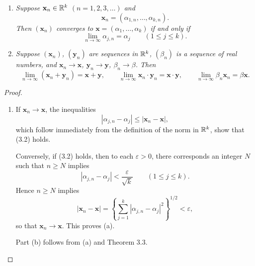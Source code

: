 \begin{enumerate}[label=(\alph*), leftmargin=2.2em, itemsep=3pt, topsep=3pt]
  \item \emph{Suppose $\mathbf{x}_n \in \mathbb{R}^k$ $(n = 1,2,3,\dots)$ and}
        \[ \mathbf{x}_n = (\alpha_{1,n},\dots,\alpha_{k,n}). \]
        \emph{Then $(\mathbf{x}_n)$ converges to
        $\mathbf{x} = (\alpha_1,\dots,\alpha_k)$ if and only if}
        \begin{equation}
          \lim_{n\to\infty} \alpha_{j,n} = \alpha_j \qquad (1 \le j \le k).
          \tag{3.2}
        \end{equation}
  \item \emph{Suppose $(\mathbf{x}_n)$, $(\mathbf{y}_n)$ are sequences in
        $\mathbb{R}^k$, $(\beta_n)$ is a sequence of real numbers, and
        $\mathbf{x}_n \to \mathbf{x}$, $\mathbf{y}_n \to \mathbf{y}$,
        $\beta_n \to \beta$. Then}
        \[ \lim_{n\to\infty}(\mathbf{x}_n+\mathbf{y}_n) = \mathbf{x}+\mathbf{y},
           \qquad
           \lim_{n\to\infty} \mathbf{x}_n\cdot\mathbf{y}_n =
           \mathbf{x}\cdot\mathbf{y}, \qquad
           \lim_{n\to\infty} \beta_n\mathbf{x}_n = \beta\mathbf{x}. \]
\end{enumerate}

\begin{proof}
\begin{enumerate}[label=(\alph*), leftmargin=2.2em, itemsep=4pt, topsep=3pt]
  \item If $\mathbf{x}_n \to \mathbf{x}$, the inequalities
        \[ |\alpha_{j,n}-\alpha_j| \le |\mathbf{x}_n-\mathbf{x}|, \]
        which follow immediately from the definition of the norm in $\mathbb{R}^k$,
        show that (3.2) holds.

        Conversely, if (3.2) holds, then to each $\varepsilon > 0$, there
        corresponds an integer $N$ such that $n \ge N$ implies
        \[ |\alpha_{j,n}-\alpha_j| < \frac{\varepsilon}{\sqrt k}
           \qquad (1 \le j \le k). \]
        Hence $n \ge N$ implies
        \[ |\mathbf{x}_n-\mathbf{x}| =
           \left\{\sum_{j=1}^{k} |\alpha_{j,n}-\alpha_j|^2\right\}^{1/2}
           < \varepsilon, \]
        so that $\mathbf{x}_n \to \mathbf{x}$. This proves (a).

        Part (b) follows from (a) and Theorem 3.3.
\end{enumerate}
\end{proof}

